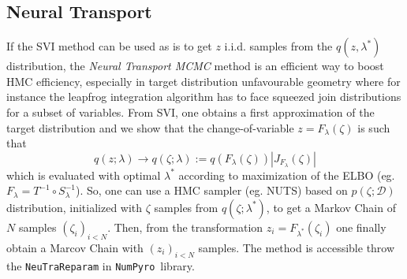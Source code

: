 \documentclass[twocolumn,twocolappendix,nofootinbib,iop]{openjournal}
\newcommand{\numpyro}{\texttt{NumPyro}}
\newcommand{\bydef}{:=}
\begin{document}
\subsection{Neural Transport}
\label{sec-Neural-Reparametrisation}
%
If the SVI method can be used as is to get $z$ i.i.d. samples from the $q(z,\lambda^\ast)$ distribution, the \textit{Neural Transport MCMC} method \citep{2014arXiv1412.5492P,2019arXiv190303704H} is an efficient way to boost HMC efficiency, especially in target distribution unfavourable geometry where for instance the leapfrog integration algorithm has to face squeezed join distributions for a subset of variables. From SVI, one obtains a first approximation of the target distribution and we show that the change-of-variable $z=F_\lambda(\zeta)$ is such that
\begin{equation}
q(z;\lambda) \rightarrow q(\zeta;\lambda) \bydef q(F_\lambda(\zeta)) |J_{F_\lambda}(\zeta)|
\end{equation}
which is evaluated with optimal $\lambda^\ast$ according to maximization of the ELBO (eg. $F_\lambda=T^{-1}\circ S^{-1}_\lambda$). So, one can use a HMC sampler (eg. NUTS) based on $p(\zeta;\mathcal{D})$ distribution, initialized with $\zeta$ samples from $q(\zeta;\lambda^\ast)$, to get a Markov Chain of $N$ samples $(\zeta_i)_{i<N}$. Then, from the transformation  $z_i=F_{\lambda^\ast}(\zeta_i)$ one finally obtain a Marcov Chain with $(z_i)_{i<N}$ samples. The method is accessible throw the \verb|NeuTraReparam| in \numpyro\ library.


%
\end{document}
